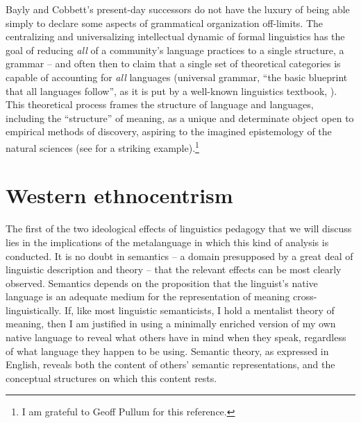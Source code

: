 \documentclass[output=paper]{langscibook}
\begin{document}
Bayly and Cobbett's present-day successors do not have the luxury of being able simply to declare some aspects of grammatical organization off-limits. The centralizing and universalizing intellectual dynamic of formal linguistics has the goal of reducing \emph{all} of a community's language practices to a single structure, a grammar -- and often then to claim that a single set of theoretical categories is capable of accounting for \emph{all} languages (universal grammar, ``the basic blueprint that all languages follow'', as it is put by a well-known linguistics textbook, \citealt[18]{Fromkinetal2010}). This theoretical process frames the structure of language and languages, including the ``structure'' of meaning, as a unique and determinate object open to empirical methods of discovery, aspiring to the imagined epistemology of the natural sciences (see \citealt{Zwicky1973} for a striking example).\footnote{I am grateful to Geoff Pullum for this reference.}

\section{Western ethnocentrism}
\label{sec:riemer:westernethnocentrim}

The first of the two ideological effects of linguistics pedagogy that we will discuss lies in the implications of the metalanguage in which this kind of analysis is conducted. It is no doubt in semantics -- a domain presupposed by a great deal of linguistic description and theory -- that the relevant effects can be most clearly observed. Semantics depends on the proposition that the linguist's native language is an adequate medium for the representation of meaning cross-linguistically. If, like most linguistic semanticists, I hold a mentalist theory of meaning, then I am justified in using a minimally enriched version of my own native language to reveal what others have in mind when they speak, regardless of what language they happen to be using. Semantic theory, as expressed in English, reveals both the content of others' semantic representations, and the conceptual structures on which this content rests.
\end{document}
